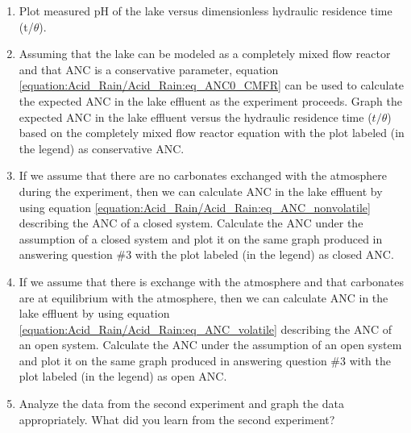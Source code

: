 \documentclass[letterpaper,10pt,english]{sphinxmanual}
\begin{document}
\begin{enumerate}
\item {} 
Plot measured pH of the lake versus dimensionless hydraulic residence time (t/\(\theta\)).

\item {} 
Assuming that the lake can be modeled as a completely mixed flow reactor and that ANC is a conservative parameter, equation \eqref{equation:Acid_Rain/Acid_Rain:eq_ANC0_CMFR} can be used to calculate the expected ANC in the lake effluent as the experiment proceeds. Graph the expected ANC in the lake effluent versus the hydraulic residence time (\(t/ \theta\)) based on the completely mixed flow reactor equation with the plot labeled (in the legend) as conservative ANC.

\item {} 
If we assume that there are no carbonates exchanged with the atmosphere during the experiment, then we can calculate ANC in the lake effluent by using equation \eqref{equation:Acid_Rain/Acid_Rain:eq_ANC_nonvolatile} describing the ANC of a closed system. Calculate the ANC under the assumption of a closed system and plot it on the same graph produced in answering question \#3 with the plot labeled (in the legend) as closed ANC.

\item {} 
If we assume that there is exchange with the atmosphere and that carbonates are at equilibrium with the atmosphere, then we can calculate ANC in the lake effluent by using equation \eqref{equation:Acid_Rain/Acid_Rain:eq_ANC_volatile} describing the ANC of an open system. Calculate the ANC under the assumption of an open system and plot it on the same graph produced in answering question \#3 with the plot labeled (in the legend) as open ANC.

\item {} 
Analyze the data from the second experiment and graph the data appropriately. What did you learn from the second experiment?

\end{enumerate}
\end{document}
